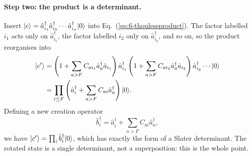 \paragraph{Step two: the product is a determinant.}
Insert $\vert c \rangle=\hat{a}^{\dagger}_{i_1}\hat{a}^{\dagger}_{i_2}\cdots
\hat{a}^{\dagger}_{i_n}\vert 0 \rangle$ into
Eq.~(\ref{eq:6-thoulessproduct}).  The factor labelled $i_1$ acts only on
$\hat{a}^{\dagger}_{i_1}$, the factor labelled $i_2$ only on
$\hat{a}^{\dagger}_{i_2}$, and so on, so the product reorganises into
\begin{align}
  \vert c' \rangle
  &= \left(1+\sum_{a>F}C_{ai_1}\hat{a}^{\dagger}_{a}\hat{a}_{i_1}\right)
     \hat{a}^{\dagger}_{i_1}
     \left(1+\sum_{a>F}C_{ai_2}\hat{a}^{\dagger}_{a}\hat{a}_{i_2}\right)
     \hat{a}^{\dagger}_{i_2}\cdots\vert 0 \rangle
     \nonumber\\
  &= \prod_{i\le F}\left(\hat{a}^{\dagger}_{i}
     + \sum_{a>F}C_{ai}\hat{a}^{\dagger}_{a}\right)\vert 0 \rangle .
  \label{eq:6-thoulessdet}
\end{align}
Defining a new creation operator
\begin{equation}
  \hat{b}^{\dagger}_{i} = \hat{a}^{\dagger}_{i}
    + \sum_{a>F}C_{ai}\hat{a}^{\dagger}_{a},
  \label{eq:6-newb}
\end{equation}
we have $\vert c' \rangle=\prod_i \hat{b}^{\dagger}_{i}\vert 0 \rangle$, which has exactly
the form of a Slater determinant.  The rotated state is a single determinant,
not a superposition: this is the whole point.

